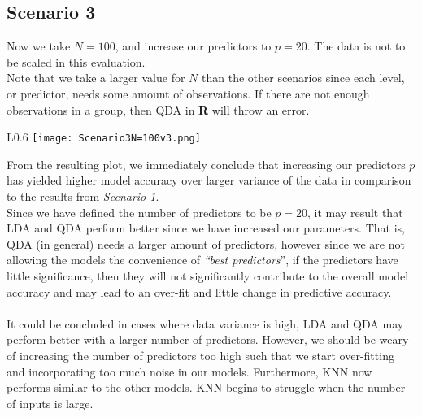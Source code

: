 \documentclass[11pt, oneside]{article}
\begin{document}



\subsection{Scenario 3} %

Now we take $N=100$, and increase our predictors to $p=20$. The data is not to be scaled in this evaluation.\\
Note that we take a larger value for $N$ than the other scenarios since each level, or predictor, needs some amount of observations. If there are not enough observations in a group, then QDA in \textbf\textsf{R} will throw an error.\\
\begin{wrapfigure}[]{L}{0.6\textwidth}
\vspace{-0.55cm}
\texttt{[image: Scenario3N=100v3.png]}
\vspace{-0.5cm}
\end{wrapfigure}

From the resulting plot, we immediately conclude that increasing our predictors $p$ has yielded higher model accuracy over larger variance of the data in comparison to the results from \emph{Scenario 1}.\\
Since we have defined the number of predictors to be $p=20$, it may result that LDA and QDA perform better since we have increased our parameters. 
That is, QDA  (in general) needs a larger amount of predictors, however since we are not allowing the models the convenience of \emph{``best predictors}'', if the predictors have little significance, then they will not significantly contribute to the overall model accuracy and may lead to an over-fit and little change in predictive accuracy.\\
\\
It could be concluded in cases where data variance is high, LDA and QDA may perform better with a larger number of predictors. However, we should be weary of increasing the number of predictors too high such that we start over-fitting and incorporating too much noise in our models. Furthermore, KNN now performs similar to the other models. KNN begins to struggle when the number of inputs is large.

\end{document}
